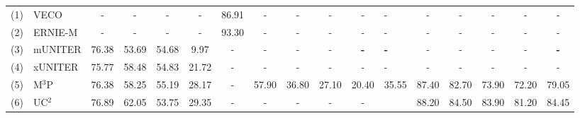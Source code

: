 \documentclass{article}
\begin{document}
\begin{table*}[]
{\begin{tabular}{@{}llccccccccclccccl@{}}
(1)       & VECO                     & -              & -              & -              & -              & 86.91          & -                         & -                                  & -                         & -                                  & -                                  & -                         & -                         & -                         & -                         & \multicolumn{1}{c}{-}          \\
(2)       & ERNIE-M                        & -              & -              & -              & -              & 93.30          & -                         & -                                  & -                         & -                                  & -                                  & -                         & -                         & -                         & -                         & \multicolumn{1}{c}{-}          \\
(3)       & mUNITER                        & 76.38          & 53.69          & 54.68          & 9.97           & -              & -                         & -                                  & -                         & \textbf{-}                         & \textbf{-}                         & -                         & -                         & -                         & -                         & \multicolumn{1}{c}{\textbf{-}} \\
(4)       & xUNITER                        & 75.77          & 58.48          & 54.83          & 21.72          & -              & -                         & -                                  & -                         & -                                  & -                                  & -                         & -                         & -                         & -                         & \multicolumn{1}{c}{-}          \\
(5)       & M$^{3}$P                            & 76.38          & 58.25          & 55.19          & 28.17          & -              & 57.90                     & 36.80                              & 27.10                     & 20.40                              & \multicolumn{1}{l}{35.55}          & 87.40                     & 82.70                     & 73.90                     & 72.20                     & 79.05                          \\
(6)       & UC$^{2}$                            & 76.89          & 62.05          & 53.75          & 29.35          & -              & -                         & -                                  & -                         & -                                  & \multicolumn{1}{l}{}               & 88.20                     & 84.50                     & 83.90                     & 81.20                     & 84.45                          \\

\end{tabular}}
\end{table*}
\end{document}
